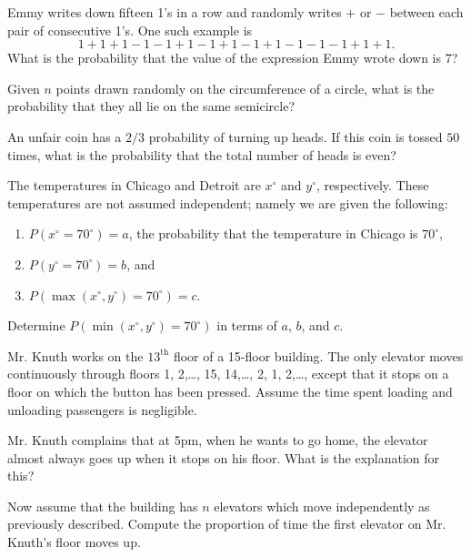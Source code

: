 \documentclass[12pt]{article}
\begin{document}
    \begin{exercise}
        Emmy writes down fifteen 1's in a row and randomly writes \(+\) or \(-\) between each pair of consecutive 1's.
        One such example is
        \[1+1+1-1-1+1-1+1-1+1-1-1-1+1+1.\]
        What is the probability that the value of the expression Emmy wrote down is 7?
    \end{exercise}
    
    \begin{exercise}
        Given \(n\) points drawn randomly on the circumference of a circle, what is the probability that they all lie on the same semicircle?
    \end{exercise}

    \begin{exercise}
        An unfair coin has a \(2/3\) probability of turning up heads. If this coin is tossed \(50\) times, what is the probability that the total number of heads is even?
    \end{exercise}

    \begin{exercise}
        The temperatures in Chicago and Detroit are \(x^\circ\) and \(y^\circ\), respectively.
        These temperatures are not assumed independent; namely we are given the following:
        \begin{enumerate}
            \item \(P(x^\circ=70^\circ)=a\), the probability that the temperature in Chicago is \(70^\circ\),
            \item \(P(y^\circ=70^\circ)=b\), and
            \item \(P(\max(x^\circ,y^\circ)=70^\circ)=c\).
        \end{enumerate}
        Determine \(P(\min(x^\circ,y^\circ)=70^\circ)\) in terms of \(a\), \(b\), and \(c\).
    \end{exercise}

    \begin{exercise}
        Mr. Knuth works on the \(13^{\text{th}}\) floor of a 15-floor building.
        The only elevator moves continuously through floors 1, 2,\dots, 15, 14,\dots, 2, 1, 2,\dots, except that it stops on a floor on which the button has been pressed.
        Assume the time spent loading and unloading passengers is negligible.

        Mr. Knuth complains that at 5pm, when he wants to go home, the elevator almost always goes up when it stops on his floor.
        What is the explanation for this?

        Now assume that the building has \(n\) elevators which move independently as previously described.
        Compute the proportion of time the first elevator on Mr. Knuth's floor moves up.
    \end{exercise}
    
\end{document}
